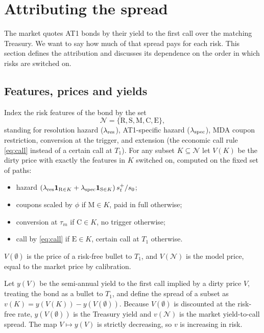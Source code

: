 \section{Attributing the spread}\label{sec:attribution}

The market quotes AT1 bonds by their yield to the first call over the matching
Treasury. We want to say how much of that spread pays for each risk. This section
defines the attribution and discusses its dependence on the order in which risks are
switched on.

\subsection{Features, prices and yields}

Index the risk features of the bond by the set
\[
  \mathcal N=\{\mathrm R,\mathrm S,\mathrm M,\mathrm C,\mathrm E\},
\]
standing for resolution hazard ($\lambda_{\mathrm{res}}$), AT1-specific hazard ($\lambda_{\mathrm{spec}}$), MDA coupon
restriction, conversion at the trigger, and extension (the economic call rule
\eqref{eq:call} instead of a certain call at $T_1$). For any subset $K\subseteq\mathcal N$
let $V(K)$ be the dirty price with exactly the features in $K$ switched on, computed on
the fixed set of paths:
\begin{itemize}
  \item hazard $(\lambda_{\mathrm{res}}\mathbf{1}_{\mathrm R\in K}+\lambda_{\mathrm{spec}}\mathbf{1}_{\mathrm S\in K})\,s^+_t/s_0$;
  \item coupons scaled by $\phi$ if $\mathrm M\in K$, paid in full otherwise;
  \item conversion at $\tau_m$ if $\mathrm C\in K$, no trigger otherwise;
  \item call by \eqref{eq:call} if $\mathrm E\in K$, certain call at $T_1$ otherwise.
\end{itemize}
$V(\emptyset)$ is the price of a risk-free bullet to $T_1$, and $V(\mathcal N)$ is the
model price, equal to the market price by calibration.

Let $y(V)$ be the semi-annual yield to the first call implied by a dirty price $V$,
treating the bond as a bullet to $T_1$, and define the spread of a subset as
$v(K)=y(V(K))-y(V(\emptyset))$. Because $V(\emptyset)$ is discounted at the risk-free
rate, $y(V(\emptyset))$ is the Treasury yield and $v(\mathcal N)$ is the market
yield-to-call spread. The map $V\mapsto y(V)$ is strictly decreasing, so $v$ is
increasing in risk.

